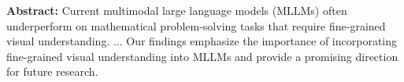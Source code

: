 \begin{textcolorbox}
\textbf{Abstract:}  Current multimodal large language models (MLLMs) often underperform on mathematical problem-solving tasks that require fine-grained visual understanding. ...
Our findings emphasize the importance of incorporating fine-grained visual understanding into MLLMs and provide a promising direction for future research.


\end{textcolorbox}
